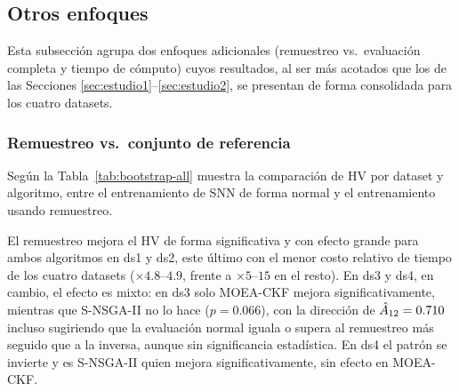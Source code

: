 \subsection{Otros enfoques}
\label{sec:otros-resultados}

Esta subsección agrupa dos enfoques adicionales (remuestreo vs.\ evaluación completa y tiempo de cómputo) cuyos resultados, al ser más acotados que los de las Secciones \ref{sec:estudio1}--\ref{sec:estudio2}, se presentan de forma consolidada para los cuatro datasets.

\subsubsection{Remuestreo vs.\ conjunto de referencia}
\label{sec:otros-bootstrap}

Según la Tabla~\ref{tab:bootstrap-all} muestra la comparación de HV por dataset y algoritmo, entre el entrenamiento de SNN de forma normal y el entrenamiento usando remuestreo. 

El remuestreo mejora el HV de forma significativa y con efecto grande para ambos algoritmos en ds1 y ds2, este último con el menor costo relativo de tiempo de los cuatro datasets ($\times4.8$--$4.9$, frente a $\times5$--$15$ en el resto). En ds3 y ds4, en cambio, el efecto es mixto: en ds3 solo MOEA-CKF mejora significativamente, mientras que S-NSGA-II no lo hace ($p=0.066$), con la dirección de $\hat{A}_{12}=0.710$ incluso sugiriendo que la evaluación normal iguala o supera al remuestreo más seguido que a la inversa, aunque sin significancia estadística. En ds4 el patrón se invierte y es S-NSGA-II quien mejora significativamente, sin efecto en MOEA-CKF. 


